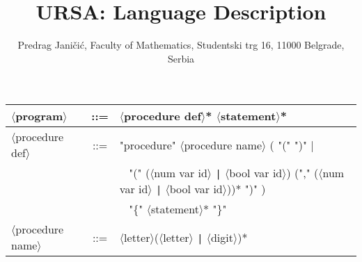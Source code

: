 \documentclass[a4paper]{article}
\begin{document}
\title{URSA: Language Description}
\author{Predrag Jani\v{c}i\'c, Faculty of Mathematics, Studentski trg 16, 11000 Belgrade, Serbia}
\date{}
\maketitle

{\scriptsize\ttfamily
\begin{center}
\begin{tabular}{lcl}
$\langle$program$\rangle$ & ::= & $\langle$procedure def$\rangle$* $\langle$statement$\rangle$*                                               \\ \hline

$\langle$procedure def$\rangle$ & ::= & "procedure" $\langle$procedure name$\rangle$ ( "(" ")" |                                              \\
                                &     & \verb| | "(" ($\langle$num var id$\rangle$ \verb_|_ $\langle$bool var id$\rangle$) ("," ($\langle$num var id$\rangle$ \verb_|_ $\langle$bool var id$\rangle$))* ")" ) \\
                                &     & \verb| | "\{" $\langle$statement$\rangle$* "\}"                                                       \\ \hline

$\langle$procedure name$\rangle$       & ::= & $\langle$letter$\rangle$($\langle$letter$\rangle$ \verb_|_ $\langle$digit$\rangle$)*           \\ \hline


\end{tabular}
\end{center}}
\end{document}
